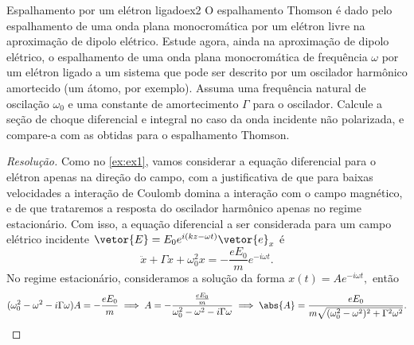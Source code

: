 \begin{exercício}{Espalhamento por um elétron ligado}{ex2}
   O espalhamento Thomson é dado pelo espalhamento de uma onda plana monocromática por um elétron livre na aproximação de dipolo elétrico. Estude agora, ainda na aproximação de dipolo elétrico, o espalhamento de uma onda plana monocromática de frequência \(\omega\) por um elétron ligado a um sistema que pode ser descrito por um oscilador harmônico amortecido (um átomo, por exemplo). Assuma uma frequência natural de oscilação \(\omega_0\) e uma constante de amortecimento \(\Gamma\) para o oscilador. Calcule a seção de choque diferencial e integral no caso da onda incidente não polarizada, e compare-a com as obtidas para o espalhamento Thomson.
\end{exercício}
\begin{proof}[Resolução]
   Como no \cref{ex:ex1}, vamos considerar a equação diferencial para o elétron apenas na direção do campo, com a justificativa de que para baixas velocidades a interação de Coulomb domina a interação com o campo magnético, e de que trataremos a resposta do oscilador harmônico apenas no regime estacionário. Com isso, a equação diferencial a ser considerada para um campo elétrico incidente \(\vetor{E} = E_0 e^{i (kz - \omega t)}\vetor{e}_x\) é
   \begin{equation*}
      \ddot{x} + \Gamma \dot{x} + \omega_0^2 x = -\frac{e E_0}{m} e^{-i \omega t}.
   \end{equation*}
   No regime estacionário, consideramos a solução da forma \(x(t) = A e^{-i \omega t},\) então
   \begin{equation*}
      (\omega_0^2 - \omega^2 - i \Gamma \omega) A = -\frac{e E_0}{m} \implies A = -\frac{\frac{e E_0}{m}}{\omega_0^2 - \omega^2 - i \Gamma \omega} \implies \abs{A} = \frac{e E_0}{m\sqrt{(\omega_0^2 - \omega^2)^2 + \Gamma^2 \omega^2}}.
   \end{equation*}
   

\end{proof}
